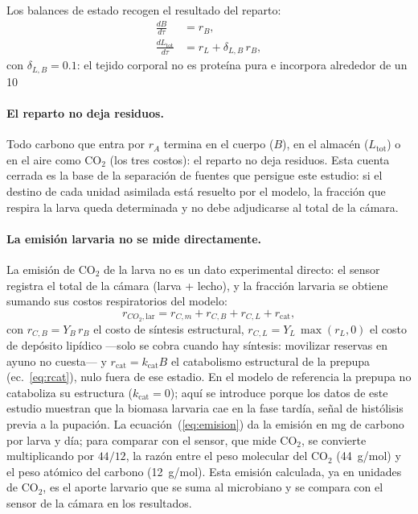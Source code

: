 Los balances de estado recogen el resultado del reparto:
\begin{align}
  \frac{dB}{d\tau} &= r_B, \label{eq:balanceB} \\
  \frac{dL_{\mathrm{tot}}}{d\tau} &= r_L + \delta_{L,B}\,r_B,
  \label{eq:balanceL}
\end{align}
con $\delta_{L,B} = 0.1$: el tejido corporal no es proteína pura e incorpora alrededor de un 10%

\paragraph{El reparto no deja residuos.}
Todo carbono que entra por $r_A$ termina en el cuerpo ($B$), en el almacén ($L_{\mathrm{tot}}$) o en el aire como CO$_2$ (los tres costos): el reparto no deja residuos. Esta cuenta cerrada es la base de la separación de fuentes que persigue este estudio: si el destino de cada unidad asimilada está resuelto por el modelo, la fracción que respira la larva queda determinada y no debe adjudicarse al total de la cámara.

\paragraph{La emisión larvaria no se mide directamente.}
La emisión de CO$_2$ de la larva no es un dato experimental directo: el sensor registra el total de la cámara (larva + lecho), y la fracción larvaria se obtiene sumando sus costos respiratorios del modelo:
\begin{equation}
  r_{CO_2,\mathrm{lar}} = r_{C,m} + r_{C,B} + r_{C,L} + r_{\mathrm{cat}},
  \label{eq:emision}
\end{equation}
con $r_{C,B} = Y_B\,r_B$ el costo de síntesis estructural, $r_{C,L} = Y_L\,\max(r_L, 0)$ el costo de depósito lipídico ---solo se cobra cuando hay síntesis: movilizar reservas en ayuno no cuesta--- y $r_{\mathrm{cat}} = k_{\mathrm{cat}}B$ el catabolismo estructural de la prepupa (ec.~\ref{eq:rcat}), nulo fuera de ese estadio. En el modelo de referencia la prepupa no cataboliza su estructura ($k_{\mathrm{cat}} = 0$); aquí se introduce porque los datos de este estudio muestran que la biomasa larvaria cae en la fase tardía, señal de histólisis previa a la pupación. La ecuación~(\ref{eq:emision}) da la emisión en mg de carbono por larva y día; para comparar con el sensor, que mide CO$_2$, se convierte multiplicando por $44/12$, la razón entre el peso molecular del CO$_2$ (44~g/mol) y el peso atómico del carbono (12~g/mol). Esta emisión calculada, ya en unidades de CO$_2$, es el aporte larvario que se suma al microbiano y se compara con el sensor de la cámara en los resultados.

